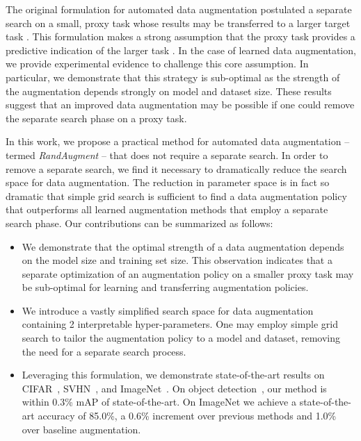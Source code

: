 The original formulation for automated data augmentation postulated a separate search on a small, proxy task whose results may be transferred to a larger target task \cite{zoph2017learning, zoph2016neural}. This formulation makes a strong assumption that the proxy task provides a predictive indication of the larger task \cite{liu2017progressive, chen2018searching}. In the case of learned data augmentation, we provide experimental evidence to challenge this core assumption. In particular, we demonstrate that
this strategy is sub-optimal as the strength of the augmentation depends strongly on model and dataset size. These results suggest that an improved data augmentation may be possible if one could remove the separate search phase on a proxy task.

In this work, we propose a practical method for automated data augmentation -- termed {\em RandAugment } -- that does not require a separate search. In order to remove a separate search, we find it necessary to dramatically reduce the search space for data augmentation.
The reduction in parameter space is in fact so dramatic that simple grid search is sufficient to find a data augmentation policy that outperforms all learned augmentation methods that employ a separate search phase.
Our contributions can be summarized as follows:

\begin{itemize}
\item We demonstrate that the optimal strength of a data augmentation depends on the model size and training set size. This observation indicates that a separate optimization of an augmentation policy on a smaller proxy task may be sub-optimal for learning and transferring augmentation policies.

\item We introduce a vastly simplified search space for data augmentation containing 2 interpretable hyper-parameters. One may employ simple grid search to tailor the augmentation policy to a model and dataset, removing the need for a separate search process.

\item Leveraging this formulation, we demonstrate state-of-the-art results on CIFAR~\cite{krizhevsky2009learning}, SVHN~\cite{netzer2011reading}, and ImageNet~\cite{imagenet2009}. On object detection~\cite{lin2014microsoft}, our method is within 0.3\% mAP of state-of-the-art. On ImageNet we achieve a state-of-the-art accuracy of 85.0\%, a 0.6\% increment over previous methods and 1.0\% over baseline augmentation.
\end{itemize}
